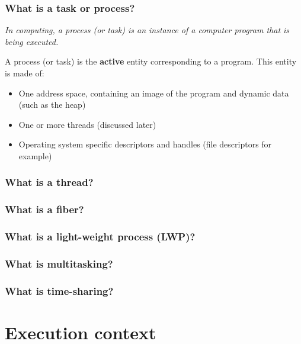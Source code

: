 \begin{frame}
  \frametitle{What is a task or process?}

  \emph{In computing, a process (or task) is an instance of a computer
  program that is being executed.}

  \-

  A process (or task) is the \textbf{active} entity corresponding to a
  program. This entity is made of:

  \begin{itemize}
  \item
    One address space, containing an image of the program and dynamic
    data (such as the heap)
  \item
    One or more threads (discussed later)
  \item
    Operating system specific descriptors and handles (file
    descriptors for example)
  \end{itemize}

\end{frame}


\begin{frame}
  \frametitle{What is a thread?}

\end{frame}


\begin{frame}
  \frametitle{What is a fiber?}

\end{frame}


\begin{frame}
  \frametitle{What is a light-weight process (LWP)?}

\end{frame}


\begin{frame}
  \frametitle{What is multitasking?}

\end{frame}


\begin{frame}
  \frametitle{What is time-sharing?}

\end{frame}

%
%

\section{Execution context}

